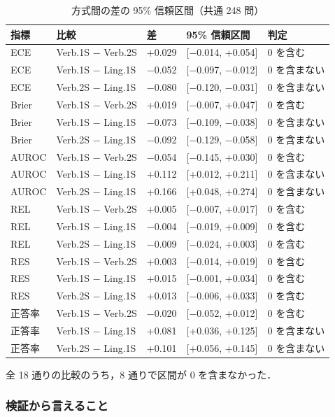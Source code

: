 \begin{table}[t]
\centering
\small
\caption{方式間の差の 95\% 信頼区間（共通 248 問）}
\label{tab:5.4}
\begin{tabular}{|l|l|l|l|l|}
\hline
指標 & 比較 & 差 & 95\% 信頼区間 & 判定 \\
\hline
ECE & Verb.1S − Verb.2S & +0.029 & [−0.014, +0.054] & 0 を含む \\
ECE & Verb.1S − Ling.1S & −0.052 & [−0.097, −0.012] & 0 を含まない \\
ECE & Verb.2S − Ling.1S & −0.080 & [−0.120, −0.031] & 0 を含まない \\
Brier & Verb.1S − Verb.2S & +0.019 & [−0.007, +0.047] & 0 を含む \\
Brier & Verb.1S − Ling.1S & −0.073 & [−0.109, −0.038] & 0 を含まない \\
Brier & Verb.2S − Ling.1S & −0.092 & [−0.129, −0.058] & 0 を含まない \\
AUROC & Verb.1S − Verb.2S & −0.054 & [−0.145, +0.030] & 0 を含む \\
AUROC & Verb.1S − Ling.1S & +0.112 & [+0.012, +0.211] & 0 を含まない \\
AUROC & Verb.2S − Ling.1S & +0.166 & [+0.048, +0.274] & 0 を含まない \\
REL & Verb.1S − Verb.2S & +0.005 & [−0.007, +0.017] & 0 を含む \\
REL & Verb.1S − Ling.1S & −0.004 & [−0.019, +0.009] & 0 を含む \\
REL & Verb.2S − Ling.1S & −0.009 & [−0.024, +0.003] & 0 を含む \\
RES & Verb.1S − Verb.2S & +0.003 & [−0.014, +0.019] & 0 を含む \\
RES & Verb.1S − Ling.1S & +0.015 & [−0.001, +0.034] & 0 を含む \\
RES & Verb.2S − Ling.1S & +0.013 & [−0.006, +0.033] & 0 を含む \\
正答率 & Verb.1S − Verb.2S & −0.020 & [−0.052, +0.012] & 0 を含む \\
正答率 & Verb.1S − Ling.1S & +0.081 & [+0.036, +0.125] & 0 を含まない \\
正答率 & Verb.2S − Ling.1S & +0.101 & [+0.056, +0.145] & 0 を含まない \\
\hline
\end{tabular}
\end{table}

全 18 通りの比較のうち，8 通りで区間が 0 を含まなかった．

\subsubsection{検証から言えること}

